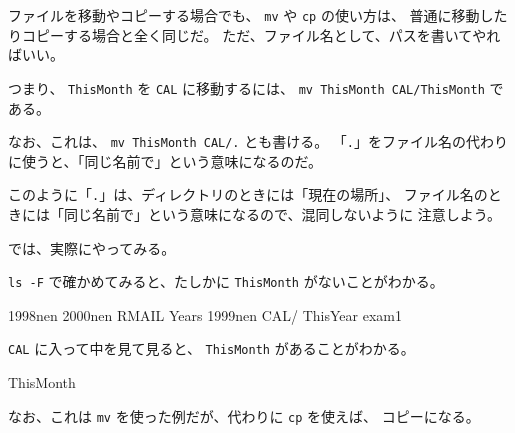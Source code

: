 ファイルを移動やコピーする場合でも、 \texttt{mv} や \texttt{cp} の使い方は、
普通に移動したりコピーする場合と全く同じだ。
ただ、ファイル名として、パスを書いてやればいい。

つまり、 \texttt{ThisMonth} を \texttt{CAL} に移動するには、
\texttt{mv ThisMonth CAL/ThisMonth} である。

なお、これは、 \texttt{mv ThisMonth CAL/.} とも書ける。
「\texttt{.}」をファイル名の代わりに使うと、「同じ名前で」という意味になるのだ。

このように「\texttt{.}」は、ディレクトリのときには「現在の場所」、
ファイル名のときには「同じ名前で」という意味になるので、混同しないように
注意しよう。

\bigskip

では、実際にやってみる。

\begin{progls}
%
\end{progls}

\texttt{ls -F} で確かめてみると、たしかに \texttt{ThisMonth} がないことがわかる。
\begin{progls}
1998nen         2000nen         RMAIL           Years
1999nen         CAL/            ThisYear        exam1
%
\end{progls}

\texttt{CAL} に入って中を見て見ると、 \texttt{ThisMonth} があることがわかる。
\begin{progls}
ThisMonth
%
\end{progls}

なお、これは \texttt{mv} を使った例だが、代わりに \texttt{cp} を使えば、
コピーになる。
\newpage
{~}
